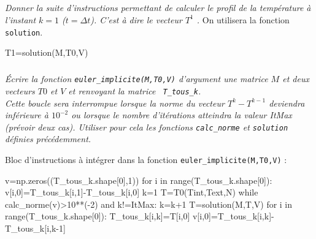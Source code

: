 \documentclass[10pt,fleqn]{article} %
\begin{document}
\else
\fi


\subparagraph{}
\textit{Donner la suite d'instructions permettant de calculer le profil de la température à 
l'instant $k=1$ ($t=\Delta t$). C'est à dire le vecteur $T^1$ .}
On utilisera la fonction  \texttt{solution}.%
\ifprof

\begin{corrige}
\begin{python}
T1=solution(M,T0,V)
\end{python}
\end{corrige}
\else
\fi


\subparagraph{}
\textit{Écrire la fonction \texttt{euler\_implicite(M,T0,V)} d'argument une matrice $M$ et 
deux vecteurs $T0$ et $V$ et renvoyant la matrice \texttt{ T\_tous\_k}.\\
Cette boucle sera interrompue lorsque la norme  du vecteur $T^k-T^{k-1}$ deviendra inférieure à $10^{-2}$ ou lorsque le nombre d'itérations atteindra la valeur ItMax (prévoir deux cas). Utiliser pour cela les fonctions \texttt{calc\_norme} et \texttt{solution} définies précédemment.}
\ifprof


\begin{corrige}
Bloc d'instructions à intégrer dans la fonction \texttt{euler\_implicite(M,T0,V)} :
\begin{python}
v=np.zeros((T_tous_k.shape[0],1))
for i in range(T_tous_k.shape[0]):
    v[i,0]=T_tous_k[i,1]-T_tous_k[i,0]
k=1
T=T0(Tint,Text,N)
while calc_norme(v)>10**(-2) and k!=ItMax:
    k=k+1
    T=solution(M,T,V)
    for i in range(T_tous_k.shape[0]):
        T_tous_k[i,k]=T[i,0]
        v[i,0]=T_tous_k[i,k]-T_tous_k[i,k-1]
\end{python}        
\end{corrige}
\else
\fi



%
\ifprof
\else
\newpage
\fi
\end{document}
